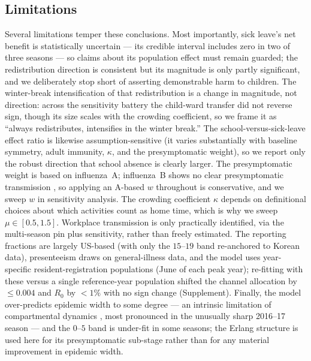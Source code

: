 \documentclass[12pt]{article}
\theoremstyle{plain}
\theoremstyle{remark}
\theoremstyle{definition}
\begin{document}
\subsection{Limitations}
Several limitations temper these conclusions. Most importantly, sick leave's net benefit is statistically uncertain --- its credible interval includes zero in two of three seasons --- so claims about its population effect must remain guarded; the redistribution direction is consistent but its magnitude is only partly significant, and we deliberately stop short of asserting demonstrable harm to children. The winter-break intensification of that redistribution is a change in magnitude, not direction: across the sensitivity battery the child-ward transfer did not reverse sign, though its size scales with the crowding coefficient, so we frame it as ``always redistributes, intensifies in the winter break.'' The school-versus-sick-leave effect ratio is likewise assumption-sensitive (it varies substantially with baseline symmetry, adult immunity, $\kappa$, and the presymptomatic weight), so we report only the robust direction that school absence is clearly larger. The presymptomatic weight is based on influenza~A; influenza~B shows no clear presymptomatic transmission \cite{NatureHealth2026}, so applying an A-based $w$ throughout is conservative, and we sweep $w$ in sensitivity analysis. The crowding coefficient $\kappa$ depends on definitional choices about which activities count as home time, which is why we sweep $\mu \in [0.5, 1.5]$. Workplace transmission is only practically identified, via the multi-season pin plus sensitivity, rather than freely estimated. The reporting fractions are largely US-based (with only the $15$--$19$ band re-anchored to Korean data), presenteeism draws on general-illness data, and the model uses year-specific resident-registration populations (June of each peak year); re-fitting with these versus a single reference-year population shifted the channel allocation by $\le 0.004$ and $R_0$ by $<1\%$ with no sign change (Supplement). Finally, the model over-predicts epidemic width to some degree --- an intrinsic limitation of compartmental dynamics \cite{Wearing2005}, most pronounced in the unusually sharp 2016--17 season --- and the $0$--$5$ band is under-fit in some seasons; the Erlang structure is used here for its presymptomatic sub-stage rather than for any material improvement in epidemic width.
\end{document}
